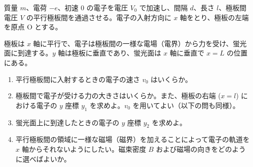 \item
    \begin{mawarikomi}{240pt}{
        
    }
質量 $m$、電荷 $-e$、初速 $0$ の電子を電圧 $V_0$ で加速し、間隔 $d$、長さ $l$、極板間電圧 $V$ の平行極板間を通過させる。電子の入射方向に $x$ 軸をとり、極板の左端を原点 $\mathrm{O}$ とする。

極板は $x$ 軸に平行で、電子は極板間の一様な電場（電界）から力を受け、蛍光面に到達する。$y$ 軸は極板に垂直であり、蛍光面は $x$ 軸に垂直で $x=L$ の位置にある。

    \begin{enumerate}
        \item 平行極板間に入射するときの電子の速さ $v_0$ はいくらか。
        \item 極板間で電子が受ける力の大きさはいくらか。また、極板の右端 ($x=l$) における電子の $y$ 座標 $y_1$ を求めよ。$v_0$ を用いてよい（以下の問も同様）。
        \item 蛍光面上に到達したときの電子の $y$ 座標 $y_2$ を求めよ。
        \item 平行極板間の領域に一様な磁場（磁界）を加えることによって電子の軌道を $x$ 軸からそれないようにしたい。磁束密度 $B$ および磁場の向きをどのように選べばよいか。
    \end{enumerate}
\end{mawarikomi}
